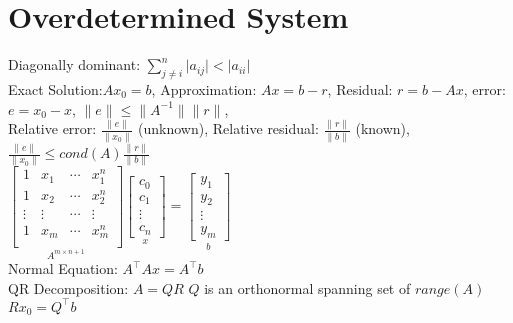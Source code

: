 \documentclass[10pt]{article}
\begin{document}
\section*{Overdetermined System}
Diagonally dominant\@: $\sum_{j\neq i}^{n}\lvert a_{ij}\rvert <\lvert a_{ii}\rvert$\\
Exact Solution\@:$Ax_0=b$, 
Approximation\@: $Ax=b-r$, 
Residual\@: $r=b-Ax$, 
error\@: $e=x_0-x$, $\lVert e\rVert\le \lVert A^{-1}\rVert\lVert r\rVert$,\\ 
Relative error\@: $\frac{\lVert e\rVert}{\lVert x_0\rVert}$ (unknown), 
Relative residual\@: $\frac{\lVert r\rVert}{\lVert b\rVert}$ (known),\\
$\frac{\lVert e\rVert}{\lVert x_0\rVert}\le cond(A)\frac{\lVert r\rVert}{\lVert b\rVert}$\\
$\underset{A^{m\times n+1}}{\begin{bmatrix}
    1 & x_1 & \cdots & x_1^{n}\\
    1 & x_2 & \cdots & x_2^{n}\\
    \vdots & \vdots & \cdots & \vdots\\
    1 & x_m & \cdots & x_m^{n}\\
\end{bmatrix}}\underset{x}{\begin{bmatrix}
    c_0\\
    c_1\\
    \vdots\\
    c_n
\end{bmatrix}}=\underset{b}{\begin{bmatrix}
    y_1\\
    y_2\\
    \vdots\\
    y_m
\end{bmatrix}}$\\ 
Normal Equation\@: $A^\top A x=A^\top b$\\
QR Decomposition\@: $A=QR$ $Q$ is an orthonormal spanning set of $range(A)$ $Rx_0=Q^\top b$
\end{document}
